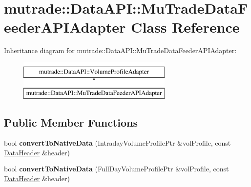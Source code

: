 \hypertarget{classmutrade_1_1_data_a_p_i_1_1_mu_trade_data_feeder_a_p_i_adapter}{\section{mutrade\-:\-:Data\-A\-P\-I\-:\-:Mu\-Trade\-Data\-Feeder\-A\-P\-I\-Adapter Class Reference}
\label{classmutrade_1_1_data_a_p_i_1_1_mu_trade_data_feeder_a_p_i_adapter}
}
Inheritance diagram for mutrade\-:\-:Data\-A\-P\-I\-:\-:Mu\-Trade\-Data\-Feeder\-A\-P\-I\-Adapter\-:\begin{figure}[H]
\begin{center}
\leavevmode
\includegraphics[height=2.000000cm]{classmutrade_1_1_data_a_p_i_1_1_mu_trade_data_feeder_a_p_i_adapter}
\end{center}
\end{figure}
\subsection*{Public Member Functions}
\begin{DoxyCompactItemize}
\item 
\hypertarget{classmutrade_1_1_data_a_p_i_1_1_mu_trade_data_feeder_a_p_i_adapter_a5a2f493a517b6c7810b7092aaabe6595}{bool {\bfseries convert\-To\-Native\-Data} (Intraday\-Volume\-Profile\-Ptr \&vol\-Profile, const \hyperlink{structmutrade_1_1_data_a_p_i_1_1_data_header}{Data\-Header} \&header)}\label{classmutrade_1_1_data_a_p_i_1_1_mu_trade_data_feeder_a_p_i_adapter_a5a2f493a517b6c7810b7092aaabe6595}

\item 
\hypertarget{classmutrade_1_1_data_a_p_i_1_1_mu_trade_data_feeder_a_p_i_adapter_a15b36ac625c477d30c3eb8210eedb2c8}{bool {\bfseries convert\-To\-Native\-Data} (Full\-Day\-Volume\-Profile\-Ptr \&vol\-Profile, const \hyperlink{structmutrade_1_1_data_a_p_i_1_1_data_header}{Data\-Header} \&header)}\label{classmutrade_1_1_data_a_p_i_1_1_mu_trade_data_feeder_a_p_i_adapter_a15b36ac625c477d30c3eb8210eedb2c8}

\end{DoxyCompactItemize}
